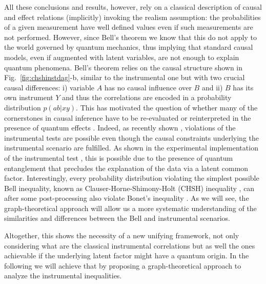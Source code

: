 \documentclass[letterpaper]{article}
\begin{document}
All these conclusions and results, however, rely on a classical
description of causal and effect relations (implicitly) invoking the
realism assumption: the probabilities of a given measurement have well
defined values even if such measurements are not performed. However,
since Bell's theorem \cite{bell1964} we know that this do not apply to the
world governed by quantum mechanics, thus implying that standard causal
models, even if augmented with latent variables, are not enough to explain
quantum phenomena. Bell's theorem relies on the causal structure shown in
Fig.~\ref{fig:chshinstdag}-b, similar to the instrumental one but with two
crucial causal differences: i) variable $A$ has no causal influence over
$B$ and ii) $B$ has its own instrument $Y$ and thus the correlations are
encoded in a probability distribution $p(ab \vert xy)$. This has motivated
the question of whether many of the cornerstones in causal inference have
to be re-evaluated or reinterpreted in the presence of quantum effects
\cite{ried2015,Costa2016,Wolfe2016,gonz1,gonz2}. Indeed, as recently
shown \cite{chaves2018}, violations of the instrumental tests are
possible even though the causal constraints underlying the instrumental
scenario are fulfilled. As shown in the experimental implementation
of the instrumental test \cite{chaves2018}, this is possible due to
the presence of quantum entanglement that precludes the explanation of
the data via a latent common factor. Interestingly, every probability
distribution violating the simplest possible Bell inequality, known as
Clauser-Horne-Shimony-Holt (CHSH) inequality \cite{CHSH}, can after some
post-processing also violate Bonet's inequality \cite{himbeeck2018}. As we
will see, the graph-theoretical approach will allow us a more systematic
understanding of the similarities and differences between the Bell and
instrumental scenarios.

Altogether, this shows the necessity of a new unifying framework, not
only considering what are the classical instrumental correlations but
as well the ones achievable if the underlying latent factor might have
a quantum origin. In the following we will achieve that by proposing a
graph-theoretical approach to analyze the instrumental inequalities.
\end{document}
